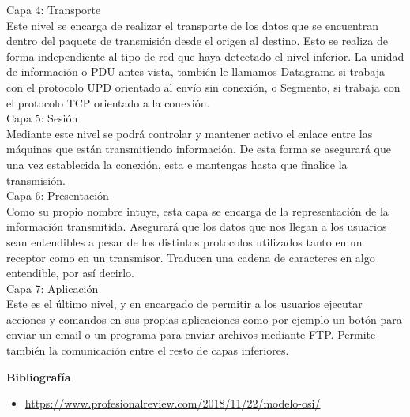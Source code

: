 \documentclass[11pt, a4paper]{report}
\begin{document}
Capa 4: Transporte \\
Este nivel se encarga de realizar el transporte de los datos que se encuentran
dentro del paquete de transmisión desde el origen al destino. Esto se realiza
de forma independiente al tipo de red que haya detectado el nivel inferior. La
unidad de información o PDU antes vista, también le llamamos Datagrama si
trabaja con el protocolo UPD orientado al envío sin conexión, o Segmento, si
trabaja con el protocolo TCP orientado a la conexión. \\

Capa 5: Sesión \\
Mediante este nivel se podrá controlar y mantener activo el enlace entre las
máquinas que están transmitiendo información. De esta forma se asegurará que
una vez establecida la conexión, esta e mantengas hasta que finalice la
transmisión. \\

Capa 6: Presentación \\
Como su propio nombre intuye, esta capa se encarga de la representación de la
información transmitida. Asegurará que los datos que nos llegan a los usuarios
sean entendibles a pesar de los distintos protocolos utilizados tanto en un
receptor como en un transmisor. Traducen una cadena de caracteres en algo
entendible, por así decirlo. \\

Capa 7: Aplicación \\
Este es el último nivel, y en encargado de permitir a los usuarios ejecutar
acciones y comandos en sus propias aplicaciones como por ejemplo un botón para
enviar un email o un programa para enviar archivos mediante FTP. Permite
también la comunicación entre el resto de capas inferiores. \\

\newpage

\textbf{Bibliografía} \\

\begin{itemize}

\item \url{https://www.profesionalreview.com/2018/11/22/modelo-osi/}


\end{itemize}
\end{document}
